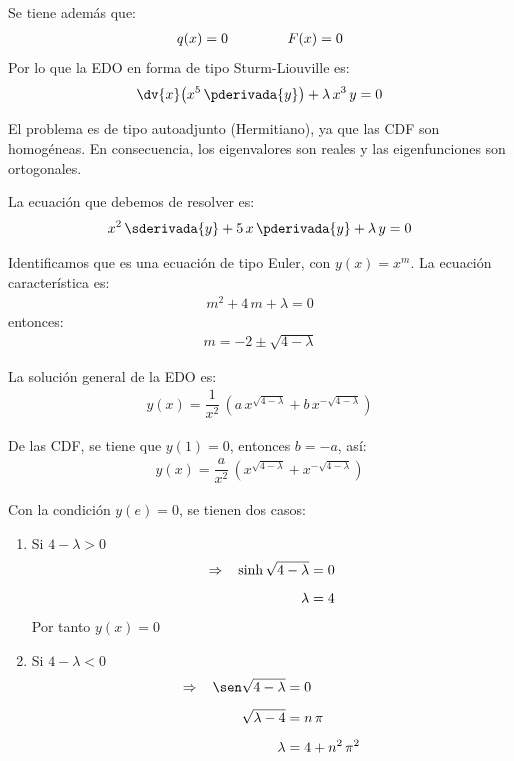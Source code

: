 \begin{ejemplo}
Se tiene además que:
\begin{align*}
q(x) = 0 \hspace{1.5cm} F(x) = 0
\end{align*}
Por lo que la EDO en forma de tipo Sturm-Liouville es:
\begin{align*}
\dv{x} \big( x^{5} \, \pderivada{y} \big) + \lambda \, x^{3} \, y = 0
\end{align*}

El problema es de tipo autoadjunto (Hermitiano), ya que las CDF son homogéneas. En consecuencia, los eigenvalores son reales y las eigenfunciones son ortogonales.
\par
La ecuación que debemos de resolver es:
\begin{align*}
x^{2} \, \sderivada{y} + 5 \, x \, \pderivada{y} + \lambda \, y = 0
\end{align*}

Identificamos que es una ecuación de tipo Euler, con $y(x) = x^{m}$. La ecuación característica es:
\begin{align*}
m^{2} + 4 \, m + \lambda = 0
\end{align*}
entonces:
\begin{align*}
m = - 2 \pm \sqrt{4 - \lambda}
\end{align*}

La solución general de la EDO es:
\begin{align*}
y (x) = \dfrac{1}{x^{2}} \, \left( a \, x^{\sqrt{4 - \lambda}} + b \, x^{- \sqrt{4 - \lambda}} \right)
\end{align*}

De las CDF, se tiene que $y (1) = 0$,  entonces $b = -a$, así:
\begin{align*}
y (x) = \dfrac{a}{x^{2}} \, \left( x^{\sqrt{4 - \lambda}} + x^{- \sqrt{4 - \lambda}} \right)
\end{align*}

Con la condición $y(e) = 0$, se tienen dos casos:
\begin{enumerate}[label=\roman*)]
\item Si $4 - \lambda > 0$
\begin{align*}
\Rightarrow \hspace{0.3cm} \sinh \sqrt{4 - \lambda} &= 0 \\[0.5em]  
\lambda &= 4
\end{align*}
Por tanto $y (x) = 0$
\item Si $4 - \lambda < 0$
\begin{align*}
\Rightarrow \hspace{0.3cm} \sen \sqrt{4 - \lambda} &= 0 \\[0.5em]  
\sqrt{\lambda - 4} &= n \, \pi \\[0.5em] 
\lambda &= 4 + n^{2} \, \pi^{2}
\end{align*}
\end{enumerate}


\end{ejemplo}
